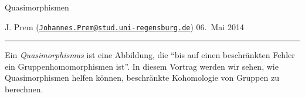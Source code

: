 %

\vspace*{-0.5cm}
\begin{center}
    \Large Quasimorphismen
\end{center}

\medskip\noindent
J. Prem (\href{mailto:Johannes.Prem@stud.uni-regensburg.de}%
{\texttt{Johannes.Prem@stud.uni-regensburg.de}})
\hfill
06.~Mai 2014
\\[-8pt]
\rule{\textwidth}{0.4pt}

\smallskip\noindent
%
Ein \emph{Quasimorphismus} ist eine Abbildung, die
\enquote{bis auf einen beschränkten Fehler ein Gruppenhomomorphismen ist}.
In diesem Vortrag werden wir sehen, wie Quasimorphismen helfen können,
beschränkte Kohomologie von Gruppen zu berechnen.
